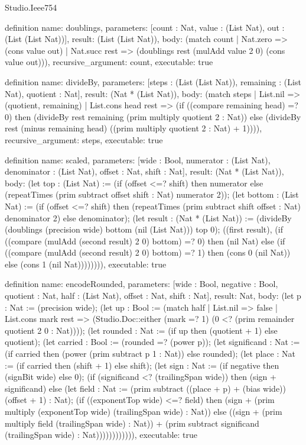 \begin{lexlean}{Studio.Ieee754}
\begin{semanticmodule}
definition{
  name: doublings,
  parameters: [count : Nat, value : (List Nat), out : (List (List Nat))],
  result: (List (List Nat)),
  body: (match count
    | Nat.zero => (cons value out)
    | Nat.succ rest => (doublings rest (mulAdd value 2 0) (cons value out))),
  recursive_argument: count,
  executable: true
}

definition{
  name: divideBy,
  parameters: [steps : (List (List Nat)), remaining : (List Nat), quotient : Nat],
  result: (Nat * (List Nat)),
  body: (match steps
    | List.nil => (quotient, remaining)
    | List.cons head rest => (if ((compare remaining head) =? 0) then (divideBy rest remaining (prim multiply quotient 2 : Nat)) else (divideBy rest (minus remaining head) ((prim multiply quotient 2 : Nat) + 1)))),
  recursive_argument: steps,
  executable: true
}

definition{
  name: scaled,
  parameters: [wide : Bool, numerator : (List Nat), denominator : (List Nat), offset : Nat, shift : Nat],
  result: (Nat * (List Nat)),
  body: (let top : (List Nat) := (if (offset <=? shift) then numerator else (repeatTimes (prim subtract offset shift : Nat) numerator 2)); (let bottom : (List Nat) := (if (offset <=? shift) then (repeatTimes (prim subtract shift offset : Nat) denominator 2) else denominator); (let result : (Nat * (List Nat)) := (divideBy (doublings (precision wide) bottom (nil (List Nat))) top 0); ((first result), (if ((compare (mulAdd (second result) 2 0) bottom) =? 0) then (nil Nat) else (if ((compare (mulAdd (second result) 2 0) bottom) =? 1) then (cons 0 (nil Nat)) else (cons 1 (nil Nat)))))))),
  executable: true
}

definition{
  name: encodeRounded,
  parameters: [wide : Bool, negative : Bool, quotient : Nat, half : (List Nat), offset : Nat, shift : Nat],
  result: Nat,
  body: (let p : Nat := (precision wide); (let up : Bool := (match half
    | List.nil => false
    | List.cons mark rest => (Studio.Doc::either (mark =? 1) (0 <? (prim remainder quotient 2 0 : Nat)))); (let rounded : Nat := (if up then (quotient + 1) else quotient); (let carried : Bool := (rounded =? (power p)); (let significand : Nat := (if carried then (power (prim subtract p 1 : Nat)) else rounded); (let place : Nat := (if carried then (shift + 1) else shift); (let sign : Nat := (if negative then (signBit wide) else 0); (if (significand <? (trailingSpan wide)) then (sign + significand) else (let field : Nat := (prim subtract ((place + p) + (bias wide)) (offset + 1) : Nat); (if ((exponentTop wide) <=? field) then (sign + (prim multiply (exponentTop wide) (trailingSpan wide) : Nat)) else ((sign + (prim multiply field (trailingSpan wide) : Nat)) + (prim subtract significand (trailingSpan wide) : Nat)))))))))))),
  executable: true
}


\end{semanticmodule}
\end{lexlean}
